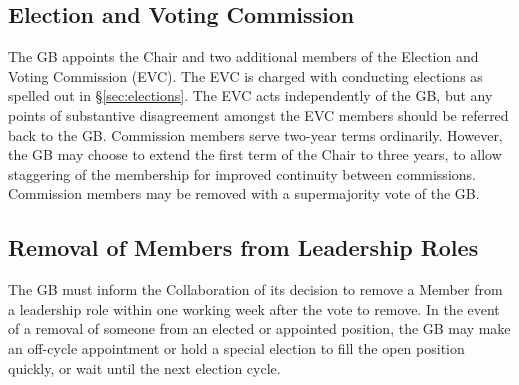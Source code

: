 \documentclass[12pt]{article}
\begin{document}
\subsection{Election and Voting Commission}
The GB appoints the Chair and two additional members of the Election and Voting Commission (EVC).  The EVC is charged with conducting elections as spelled out in \S\ref{sec:elections}. The EVC acts independently of the GB, but any points of substantive disagreement amongst the EVC members should be referred back to the GB.  Commission members serve two-year terms ordinarily.  However, the GB may choose to extend the first term of the Chair to  three years, to allow staggering of the membership for improved continuity between commissions.   Commission members may be removed with a supermajority vote of the GB.
 
 \subsection{Removal of Members  from Leadership Roles}
 The GB must inform the Collaboration of its decision to remove a Member from a leadership role within one working week after the vote to remove.  In the event of a removal of someone from an elected or appointed position, the GB may make an off-cycle appointment or hold a special election to fill the open position quickly, or wait until the next election cycle.  
 
\end{document}
